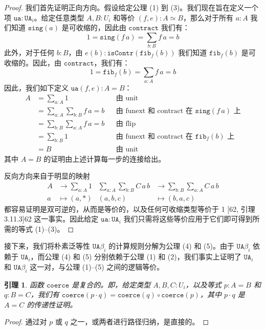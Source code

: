 \documentclass{ctexrep}
\theoremstyle{plain}
\newtheorem{lemma}[theorem]{引理}
\theoremstyle{definition}
\theoremstyle{remark}
\begin{document}
\begin{proof}
我们首先证明正向方向。假设给定公理 (1) 到 (3)。我们现在旨在定义一个项 $\mathtt{ua} : \mathtt{UA}_i$。给定任意类型 $A, B : U_i$ 和等价 $(f, e) : A \simeq B$，那么对于所有 $a : A$ 我们知道 $\mathtt{sing}(a)$ 是可收缩的，因此由 $\mathtt{contract}$ 我们有：
\[
1 = \mathtt{sing}(f\,a) = \sum_{b:B} f\,a = b
\]
此外，对于任何 $b : B$，由 $e(b) : \mathtt{isContr}(\mathtt{fib}_f(b))$ 我们知道 $\mathtt{fib}_f(b)$ 是可收缩的。因此，由 $\mathtt{contract}$，我们有：
\[
1 = \mathtt{fib}_f(b) = \sum_{a:A} f\,a = b
\]
因此，我们如下定义 $\mathtt{ua}(f, e) : A = B$：
\begin{align*}
A &= \sum_{a:A} 1 && \text{由 unit} \\
&= \sum_{a:A} \sum_{b:B} f\,a = b && \text{由 funext 和 contract 在 } \mathtt{sing}(f\,a) \text{ 上} \\
&= \sum_{b:B} \sum_{a:A} f\,a = b && \text{由 flip} \\
&= \sum_{b:B} 1 && \text{由 funext 和 contract 在 } \mathtt{fib}_f(b) \text{ 上} \\
&= B && \text{由 unit}
\end{align*}
其中 $A = B$ 的证明由上述计算每一步的连接给出。

反向方向来自于明显的映射
\[
\begin{aligned}
A &\to \sum_{a:A} 1 & \sum_{a:A}\sum_{b:B} C\,a\,b &\to \sum_{b:B}\sum_{a:A} C\,a\,b \\
a &\mapsto (a, *) & (a, b, c) &\mapsto (b, a, c)
\end{aligned}
\]
都容易证明是双可逆的，从而是等价的，以及任何可收缩类型等价于 1 [62, 引理 3.11.3]{62} 这一事实。因此给定 $\mathtt{ua} : \mathtt{UA}_i$ 我们只需将这些等价应用于它们即可得到所需的等式 (1)--(3)。
\end{proof}

接下来，我们将朴素泛等性 $\mathtt{UA}\beta_i$ 的计算规则分解为公理 (4) 和 (5)。由于 $\mathtt{UA}\beta_i$ 依赖于 $\mathtt{UA}_i$，而公理 (4) 和 (5) 分别依赖于公理 (1) 和 (2)，我们事实上证明了 $\mathtt{UA}_i$ 和 $\mathtt{UA}\beta_i$ 这一对，与公理 (1)--(5) 之间的逻辑等价。

\begin{lemma}
函数 $\mathtt{coerce}$ 是复合的。即，给定类型 $A, B, C : U_i$，以及等式 $p : A = B$ 和 $q : B = C$，我们有 $\mathtt{coerce}(p \cdot q) = \mathtt{coerce}(q) \circ \mathtt{coerce}(p)$，其中 $p \cdot q$ 是 $A = C$ 的传递性证明。
\end{lemma}

\begin{proof}
通过对 $p$ 或 $q$ 之一，或两者进行路径归纳，是直接的。
\end{proof}
\end{document}
